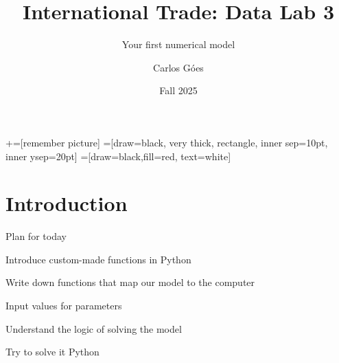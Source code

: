 \documentclass[notes,11pt, aspectratio=169, xcolor=table]{beamer}
\title[]{International Trade: Data Lab 3}
\subtitle[]{Your first numerical model}
\author[Góes]
{Carlos Góes\inst{1}}
\date{Fall 2025}
\institute[GWU]{\inst{1} George Washington University }
\newenvironment{wideitemize}{\itemize\addtolength{\itemsep}{10pt}}{\enditemize}
\begin{document}
\newcommand\marktopleft[1]{%
    \tikz[overlay,remember picture] 
        \node (marker-#1-a) at (-.3em,.3em) {};%
}
\newcommand\markbottomright[2]{%
    \tikz[overlay,remember picture] 
        \node (marker-#1-b) at (0em,0em) {};%
}
+=[remember picture] 
 =[draw=black, very thick, rectangle, inner sep=10pt, inner ysep=20pt]
 =[draw=black,fill=red, text=white]















\frame{\titlepage}
\addtocounter{framenumber}{-1}




\section{Introduction}

\begin{frame}{Plan for today}

\begin{wideitemize}
    \item Introduce custom-made functions in Python
    \item Write down functions that map our model to the computer
    \item Input values for parameters
    \item Understand the logic of solving the model
    \item Try to solve it Python
\end{wideitemize}
    
\end{frame}
\end{document}
